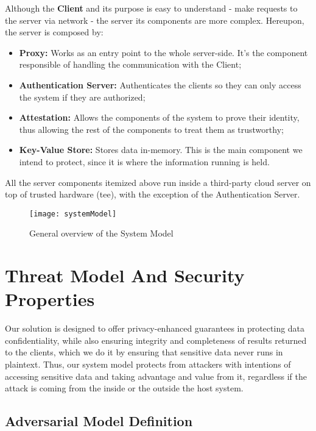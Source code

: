 Although the \textbf{Client} and its purpose is easy to understand - make requests to the server via network - the server its components are more complex. Hereupon, the server is composed by: 
\begin{itemize}
	\item \textbf{Proxy:} Works as an entry point to the whole server-side. It's the component responsible of handling the communication with the Client;
	\item \textbf{Authentication Server:} Authenticates the clients so they can only access the system if they are authorized;
	\item \textbf{Attestation:} Allows the components of the system to prove their identity, thus allowing the rest of the components to treat them as trustworthy;
	\item \textbf{Key-Value Store:} Stores data in-memory. This is the main component we intend to protect, since it is where the information running is held.
\end{itemize} 


All the server components itemized above run inside a third-party cloud server on top of trusted hardware (\gls{tee}), with the exception of the Authentication Server.

\vspace{5mm}
\begin{figure}[htbp]
	\centering
	{\texttt{[image: systemModel]}}
	\caption{General overview of the System Model}
	\label{fig:systemModel}
\end{figure}


\section{Threat Model And Security Properties} %
\label{sec:threatModel_and_securityProperties}

Our solution is designed to offer privacy-enhanced guarantees in protecting data confidentiality, while also ensuring integrity and completeness of results returned to the clients, which we do it by ensuring that sensitive data never runs in plaintext. 
Thus, our system model protects from attackers with intentions of accessing sensitive data and taking advantage and value from it, regardless if the attack is coming from the inside or the outside the host system.


\subsection{Adversarial Model Definition}


